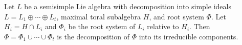 Let $L$ be a semisimple Lie algebra with decomposition into simple ideals $L = L_1 \oplus \cdots \oplus L_t$, maximal toral subalgebra $H$, and root system $\Phi$. Let $H_i = H \cap L_i$ and $\Phi_i$ be the root system of $L_i$ relative to $H_i$. Then $\Phi = \Phi_1 \cup \cdots \cup \Phi_t$ is the decomposition of $\Phi$ into its irreducible components.

